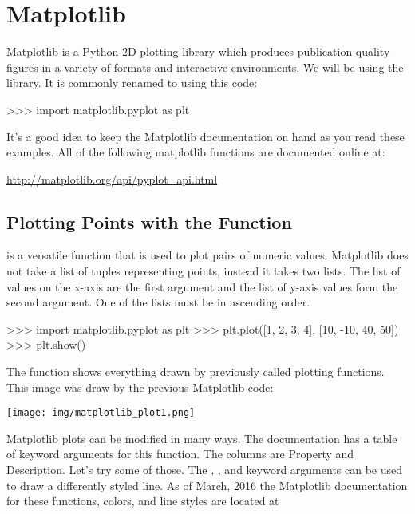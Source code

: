 \documentclass[11pt]{cselabheader}
\begin{document}
\section{Matplotlib}

Matplotlib is a Python 2D plotting library which produces publication
quality figures in a variety of formats and interactive environments.
We will be using the  library. It is
commonly renamed to  using this code:

\begin{pyconcode}
>>> import matplotlib.pyplot as plt
\end{pyconcode}

It's a good idea to keep the Matplotlib documentation on hand as you read these
examples. All of the following matplotlib functions are documented online at:
\begin{center}
\url{http://matplotlib.org/api/pyplot_api.html}
\end{center}

\subsection{Plotting Points with the  Function}

 is a versatile function that is used to plot
pairs of numeric values. Matplotlib does not take a list of tuples
representing points, instead it takes two lists. The list of values on
the x-axis are the first argument and the list of y-axis values form
the second argument. One of the lists must be in ascending order.

\begin{pyconcode}
>>> import matplotlib.pyplot as plt
>>> plt.plot([1, 2, 3, 4], [10, -10, 40, 50])
>>> plt.show()
\end{pyconcode}

The  function shows everything drawn by
previously called plotting functions. This image was draw by
the previous Matplotlib code:

\begin{center}
\texttt{[image: img/matplotlib\_plot1.png]}
\end{center}

Matplotlib plots can be modified in many ways. The documentation has a
table of keyword arguments for this function. The columns are Property
and Description.  Let's try some of those. The ,
, and  keyword arguments
can be used to draw a differently styled line.  As of March, 2016 the
Matplotlib documentation for these functions, colors, and line styles
are located at
\end{document}
